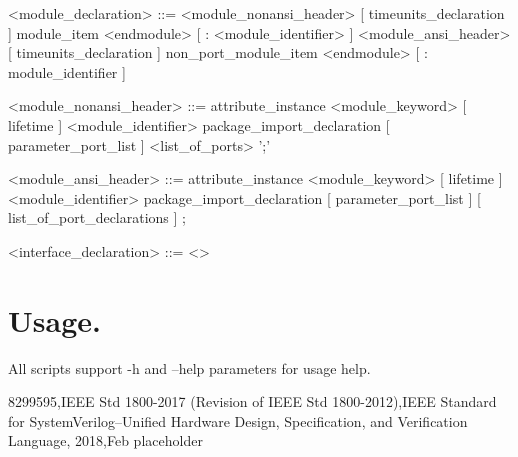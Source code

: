 \documentclass{article}
\begin{document}
\begin{grammar}
<module_declaration> ::= <module_nonansi_header> [ timeunits_declaration ] { module_item }
<endmodule> [ : <module_identifier> ]
\alt <module_ansi_header> [ timeunits_declaration ] { non_port_module_item }
<endmodule> [ : module_identifier ]
\end{grammar}

\begin{grammar}
<module_nonansi_header> ::= { attribute_instance } <module_keyword> [ lifetime ] <module_identifier>
{ package_import_declaration } [ parameter_port_list ] <list_of_ports> ';'
\end{grammar}

\begin{grammar}
<module_ansi_header> ::= { attribute_instance } <module_keyword> [ lifetime ] <module_identifier>
{ package_import_declaration } [ parameter_port_list ] [ list_of_port_declarations ] ;
\end{grammar}

\begin{grammar}
<interface_declaration> ::= <>
\end{grammar}

%


\section{Usage.}
{ All scripts support -h and --help parameters for usage help.}

\begin{thebibliography}{9}
8299595,IEEE Std 1800-2017 (Revision of IEEE Std 1800-2012),IEEE Standard for SystemVerilog--Unified Hardware Design, Specification, and Verification Language,
2018,Feb
placeholder

\end{thebibliography}
\end{document}
